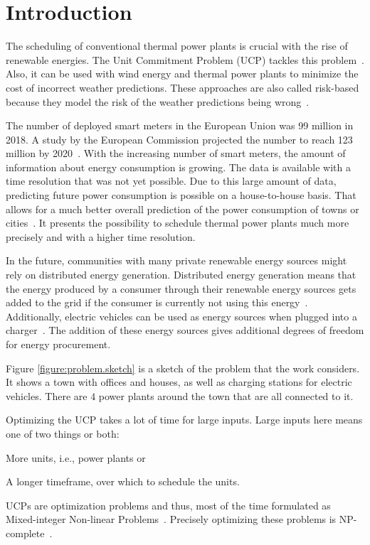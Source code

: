 \chapter{Introduction}

The scheduling of conventional thermal power plants is crucial with the rise of renewable energies.
The Unit Commitment Problem (UCP) tackles this problem~\cite{Banos2011}.
Also, it can be used with wind energy and thermal power plants to minimize the cost of incorrect weather predictions.
These approaches are also called risk-based because they model the risk of the weather predictions being wrong~\cite{Chen2008, Abujarad2017}.

The number of deployed smart meters in the European Union was 99 million in 2018.
A study by the European Commission projected the number to reach 123 million by 2020~\cite{Vlachogiannis2019}.
With the increasing number of smart meters, the amount of information about energy consumption is growing.
The data is available with a time resolution that was not yet possible.
Due to this large amount of data, predicting future power consumption is possible on a house-to-house basis.
That allows for a much better overall prediction of the power consumption of towns or cities~\cite{Aiello2016, Basu2013}.
It presents the possibility to schedule thermal power plants much more precisely and with a higher time resolution.

In the future, communities with many private renewable energy sources might rely on distributed energy generation.
Distributed energy generation means that the energy produced by a consumer through their renewable energy sources gets added to the grid if the consumer is currently not using this energy~\cite{Aiello2016}.
Additionally, electric vehicles can be used as energy sources when plugged into a charger~\cite{Zhang2016}.
The addition of these energy sources gives additional degrees of freedom for energy procurement.

Figure \ref{figure:problem.sketch} is a sketch of the problem that the work considers.
It shows a town with offices and houses, as well as charging stations for electric vehicles.
There are $4$ power plants around the town that are all connected to it.

Optimizing the UCP takes a lot of time for large inputs.
Large inputs here means one of two things or both:
\begin{enumerate*}[label=(\roman*)]
  \item More units, i.e., power plants or
  \item A longer timeframe, over which to schedule the units.
\end{enumerate*}
UCPs are optimization problems and thus, most of the time formulated as Mixed-integer Non-linear Problems~\cite{Baldick1995}.
Precisely optimizing these problems is NP-complete~\cite{Li2005, Bienstock1996}.

